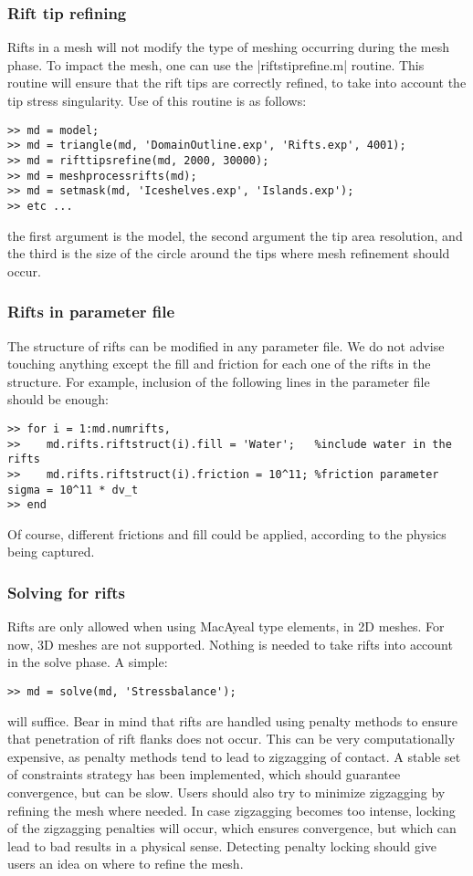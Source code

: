 \subsubsection{Rift tip refining}
Rifts in a mesh will not modify the type of meshing occurring during the mesh phase. To impact the mesh, one can use the \lstinlinebg|riftstiprefine.m| routine. This routine will ensure that the rift tips are correctly refined, to take into account the tip stress singularity. Use of this routine is as follows:
\begin{lstlisting}
>> md = model;
>> md = triangle(md, 'DomainOutline.exp', 'Rifts.exp', 4001);
>> md = rifttipsrefine(md, 2000, 30000);
>> md = meshprocessrifts(md);
>> md = setmask(md, 'Iceshelves.exp', 'Islands.exp');
>> etc ...
\end{lstlisting}
the first argument is the model, the second argument the tip area resolution, and the third is the
size of the circle around the tips where mesh refinement should occur.

\subsubsection{Rifts in parameter file}
The structure of rifts can be modified in any parameter file. We do not advise touching anything except the fill and friction for each one of the rifts in the structure. For example, inclusion of the following lines in the parameter file should be enough:
\begin{lstlisting}
>> for i = 1:md.numrifts,
>>    md.rifts.riftstruct(i).fill = 'Water';   %include water in the rifts
>>    md.rifts.riftstruct(i).friction = 10^11; %friction parameter sigma = 10^11 * dv_t
>> end
\end{lstlisting}

Of course, different frictions and fill could be applied, according to the physics being captured.

\subsubsection{Solving for rifts}
Rifts are only allowed when using MacAyeal type elements, in 2D meshes. For now, 3D meshes are not supported. Nothing is needed to take rifts into account in the solve phase. A simple:
\begin{lstlisting}
>> md = solve(md, 'Stressbalance');
\end{lstlisting}
will suffice. Bear in mind that rifts are handled using penalty methods to ensure that penetration of rift flanks does not occur. This can be very computationally expensive, as penalty methods tend to lead to zigzagging of contact. A stable set of constraints strategy has been implemented, which should guarantee convergence, but can be slow. Users should also try to minimize zigzagging by refining the mesh where needed. In case zigzagging becomes too intense, locking of the zigzagging penalties will occur, which ensures convergence, but which can lead to bad results in a physical sense. Detecting penalty locking should give users an idea on where to refine the mesh.

